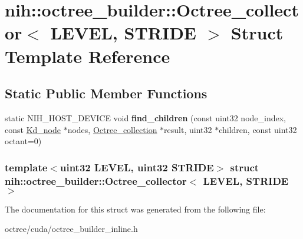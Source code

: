 \hypertarget{structnih_1_1octree__builder_1_1_octree__collector}{
\section{nih\-:\-:octree\-\_\-builder\-:\-:\-Octree\-\_\-collector$<$ \-L\-E\-V\-E\-L, \-S\-T\-R\-I\-D\-E $>$ \-Struct \-Template \-Reference}
\label{structnih_1_1octree__builder_1_1_octree__collector}
}
\subsection*{\-Static \-Public \-Member \-Functions}
\begin{DoxyCompactItemize}
\item 
\hypertarget{structnih_1_1octree__builder_1_1_octree__collector_a625b435a5d84e54bd6a9a5dcd83cd297}{
static \-N\-I\-H\-\_\-\-H\-O\-S\-T\-\_\-\-D\-E\-V\-I\-C\-E void {\bfseries find\-\_\-children} (const uint32 node\-\_\-index, const \hyperlink{structnih_1_1_bintree__node}{\-Kd\-\_\-node} $\ast$nodes, \hyperlink{structnih_1_1octree__builder_1_1_octree__collection}{\-Octree\-\_\-collection} $\ast$result, uint32 $\ast$children, const uint32 octant=0)}
\label{structnih_1_1octree__builder_1_1_octree__collector_a625b435a5d84e54bd6a9a5dcd83cd297}

\end{DoxyCompactItemize}
\subsubsection*{template$<$uint32 \-L\-E\-V\-E\-L, uint32 \-S\-T\-R\-I\-D\-E$>$ struct nih\-::octree\-\_\-builder\-::\-Octree\-\_\-collector$<$ L\-E\-V\-E\-L, S\-T\-R\-I\-D\-E $>$}



\-The documentation for this struct was generated from the following file\-:\begin{DoxyCompactItemize}
\item 
octree/cuda/octree\-\_\-builder\-\_\-inline.\-h\end{DoxyCompactItemize}
